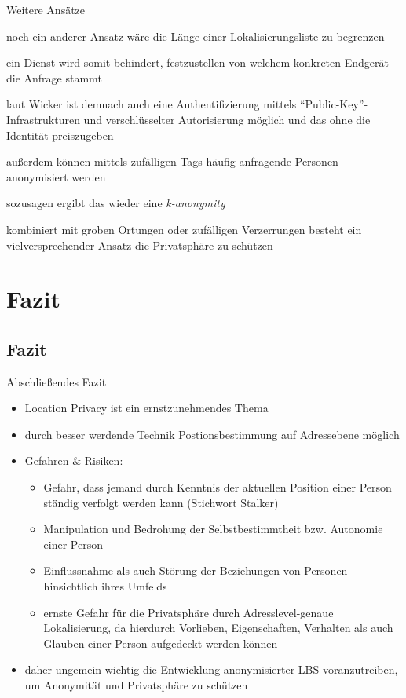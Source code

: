 \begin{frame}{Weitere Ansätze}
\itemize
\item noch ein anderer Ansatz wäre die Länge einer Lokalisierungsliste zu begrenzen
\item ein Dienst wird somit behindert, festzustellen von welchem konkreten Endgerät die Anfrage stammt
\item laut Wicker ist demnach auch eine Authentifizierung mittels "`Public-Key"'-Infrastrukturen und verschlüsselter Autorisierung möglich und das ohne die Identität preiszugeben
\item außerdem können mittels zufälligen Tags häufig anfragende Personen anonymisiert werden
\item sozusagen ergibt das wieder eine \textit{k-anonymity}
\item kombiniert mit groben Ortungen oder zufälligen Verzerrungen besteht ein vielversprechender Ansatz die Privatsphäre zu schützen
\enditemize
\end{frame}

\section{Fazit}
\subsection{Fazit}
\begin{frame}{Abschließendes Fazit}
\begin{itemize}
  \item Location Privacy ist ein ernstzunehmendes Thema
  \item durch besser werdende Technik Postionsbestimmung auf Adressebene möglich
  \item Gefahren \& Risiken:
  \begin{itemize}
  \item Gefahr, dass jemand durch Kenntnis der aktuellen Position einer Person ständig verfolgt werden kann (Stichwort Stalker)
  \item Manipulation und Bedrohung der Selbstbestimmtheit bzw. Autonomie einer Person
  \item Einflussnahme als auch Störung der Beziehungen von Personen hinsichtlich ihres Umfelds
  \item ernste Gefahr für die Privatsphäre durch Adresslevel-genaue Lokalisierung, da hierdurch Vorlieben, Eigenschaften, Verhalten als auch Glauben einer Person aufgedeckt werden können  
  \end{itemize}
  \item daher ungemein wichtig die Entwicklung anonymisierter LBS voranzutreiben, um Anonymität und Privatsphäre zu schützen
\end{itemize}
\end{frame} 

